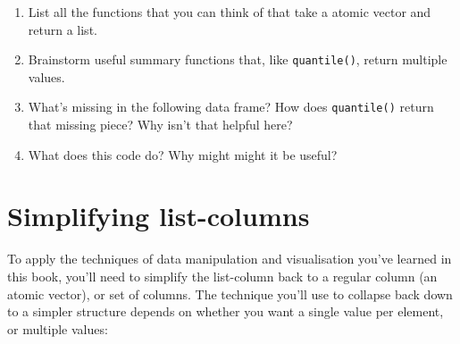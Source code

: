 \documentclass[]{book}
\newenvironment{Shaded}{\begin{snugshade}}{\end{snugshade}}
\newcommand{\KeywordTok}[1]{\textcolor[rgb]{0.13,0.29,0.53}{\textbf{{#1}}}}
\newcommand{\DataTypeTok}[1]{\textcolor[rgb]{0.13,0.29,0.53}{{#1}}}
\newcommand{\StringTok}[1]{\textcolor[rgb]{0.31,0.60,0.02}{{#1}}}
\newcommand{\CommentTok}[1]{\textcolor[rgb]{0.56,0.35,0.01}{\textit{{#1}}}}
\newcommand{\NormalTok}[1]{{#1}}
\begin{document}
\begin{enumerate}
\def\labelenumi{\arabic{enumi}.}
\item
  List all the functions that you can think of that take a atomic vector
  and return a list.
\item
  Brainstorm useful summary functions that, like \texttt{quantile()},
  return multiple values.
\item
  What's missing in the following data frame? How does
  \texttt{quantile()} return that missing piece? Why isn't that helpful
  here?

\begin{Shaded}
\end{Shaded}
\item
  What does this code do? Why might might it be useful?

\begin{Shaded}
\end{Shaded}
\end{enumerate}

\hypertarget{simplifying-list-columns}{\section{Simplifying
list-columns}\label{simplifying-list-columns}}

To apply the techniques of data manipulation and visualisation you've
learned in this book, you'll need to simplify the list-column back to a
regular column (an atomic vector), or set of columns. The technique
you'll use to collapse back down to a simpler structure depends on
whether you want a single value per element, or multiple values:
\end{document}
